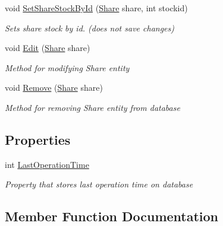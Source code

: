 \begin{DoxyCompactItemize}
void \mbox{\hyperlink{class_gielda_l2_1_1_i_n_f_r_a_s_t_r_u_c_t_u_r_e_1_1_repositories_1_1_share_repository_a9ab77adf00ff67d057e01c6fa2c8278c}{Set\+Share\+Stock\+By\+Id}} (\mbox{\hyperlink{class_gielda_l2_1_1_d_b_1_1_entities_1_1_share}{Share}} share, int stockid)
\begin{DoxyCompactList}\small\item\em Sets share stock by id. (does not save changes) \end{DoxyCompactList}\item 
void \mbox{\hyperlink{class_gielda_l2_1_1_i_n_f_r_a_s_t_r_u_c_t_u_r_e_1_1_repositories_1_1_share_repository_ac3b39b1ed8794698ad74054688667e6a}{Edit}} (\mbox{\hyperlink{class_gielda_l2_1_1_d_b_1_1_entities_1_1_share}{Share}} share)
\begin{DoxyCompactList}\small\item\em Method for modifying Share entity \end{DoxyCompactList}\item 
void \mbox{\hyperlink{class_gielda_l2_1_1_i_n_f_r_a_s_t_r_u_c_t_u_r_e_1_1_repositories_1_1_share_repository_a76ee0cf8f78b19983167a3bcdff4e405}{Remove}} (\mbox{\hyperlink{class_gielda_l2_1_1_d_b_1_1_entities_1_1_share}{Share}} share)
\begin{DoxyCompactList}\small\item\em Method for removing Share entity from database \end{DoxyCompactList}\end{DoxyCompactItemize}
\subsection*{Properties}
\begin{DoxyCompactItemize}
\item 
int \mbox{\hyperlink{class_gielda_l2_1_1_i_n_f_r_a_s_t_r_u_c_t_u_r_e_1_1_repositories_1_1_share_repository_ad778ea8d672a171a35af26957efe3c88}{Last\+Operation\+Time}}
\begin{DoxyCompactList}\small\item\em Property that stores last operation time on database \end{DoxyCompactList}\end{DoxyCompactItemize}


\subsection{Member Function Documentation}
\mbox{\label{class_gielda_l2_1_1_i_n_f_r_a_s_t_r_u_c_t_u_r_e_1_1_repositories_1_1_share_repository_ab72f6f527449750b41956b564c892a7c}} 
